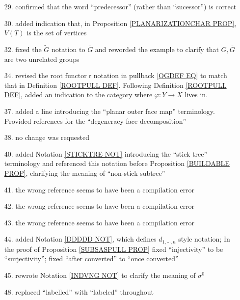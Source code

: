 \documentclass{article}
\begin{document}
\begin{itemize}
\item[29.] confirmed that the word ``predecessor'' (rather than ``sucessor'') is correct

\item[30.] added indication that, 
in Proposition \ref{PLANARIZATIONCHAR PROP},
$V(T)$ is the set of vertices

\item[32.] fixed the $\tilde{G}$ notation to $\bar{G}$ and reworded the example to clarify that $G,\bar{G}$ are two unrelated groups

\item[34.] revised the root functor $\mathsf{r}$ notation in pullback \eqref{OGDEF EQ} 
to match that in Definition \ref{ROOTPULL DEF}.
Following Definition \ref{ROOTPULL DEF},
added an indication to the category where 
$\varphi \colon Y \to X$ lives in.

\item[37.] added a line introducing the ``planar outer face map'' terminology. Provided references for the ``degeneracy-face decomposition'' 

\item[38.] no change was requested

\item[40.] added Notation \ref{STICKTRE NOT} introducing the ``stick tree'' terminology and referenced this notation before
Proposition \ref{BUILDABLE PROP},
clarifying the meaning of ``non-stick subtree''

\item[41.] the wrong reference seems to have been a compilation error

\item[42.] the wrong reference seems to have been a compilation error

\item[43.] the wrong reference seems to have been a compilation error

\item[44.] added Notation \ref{DDDDD NOT}, 
which defines $d_{1,\cdots,n}$ style notation; 
In the proof of Proposition \ref{SUBSASPULL PROP}
fixed ``injectivity'' to be ``surjectivity''; fixed ``after converted'' to ``once converted''

\item[45.] rewrote Notation \ref{INDVNG NOT}
to clarify the meaning of $\sigma^0$ 

\item[48.] replaced ``labelled'' with ``labeled'' throughout


\end{itemize}
\end{document}
